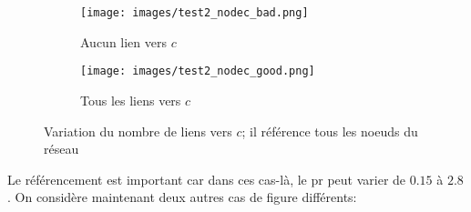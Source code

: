 \documentclass[12pt,twoside, openright]{memoir}
\begin{document}
	\begin{figure}[ht]
		\begin{subfigure}[b]{.5\linewidth}
			\centering
			\texttt{[image: images/test2\_nodec\_bad.png]} 
			\caption{Aucun lien vers $c$} 
		\end{subfigure}%
		\begin{subfigure}[b]{.5\linewidth}
			\centering
			\texttt{[image: images/test2\_nodec\_good.png]} 
			\caption{Tous les liens vers $c$}
		\end{subfigure}
		\caption{Variation du nombre de liens vers $c$; il référence tous les noeuds du réseau}
		\label{l_tests}
	\end{figure}
	Le référencement est important car dans ces cas-là, le \gls{pr} peut varier de $0.15$ à $2.8$.\newpage
	On considère maintenant deux autres cas de figure différents:
\end{document}
